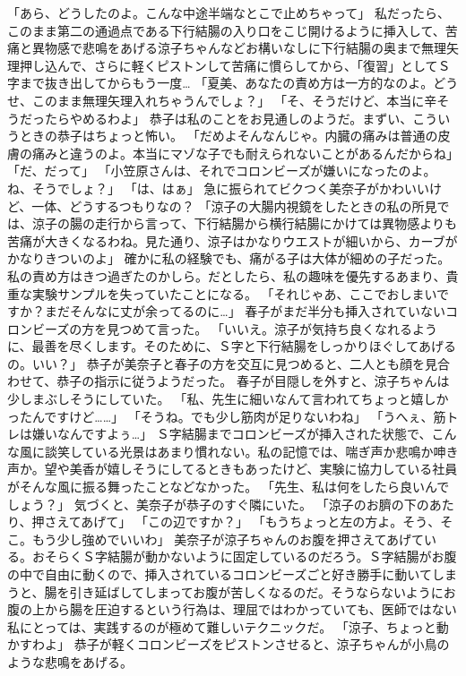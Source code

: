 「あら、どうしたのよ。こんな中途半端なとこで止めちゃって」
私だったら、このまま第二の通過点である下行結腸の入り口をこじ開けるように挿入して、苦痛と異物感で悲鳴をあげる涼子ちゃんなどお構いなしに下行結腸の奥まで無理矢理押し込んで、さらに軽くピストンして苦痛に慣らしてから、「復習」としてＳ字まで抜き出してからもう一度…
「夏美、あなたの責め方は一方的なのよ。どうせ、このまま無理矢理入れちゃうんでしょ？」
「そ、そうだけど、本当に辛そうだったらやめるわよ」
恭子は私のことをお見通しのようだ。まずい、こういうときの恭子はちょっと怖い。
「だめよそんなんじゃ。内臓の痛みは普通の皮膚の痛みと違うのよ。本当にマゾな子でも耐えられないことがあるんだからね」
「だ、だって」
「小笠原さんは、それでコロンビーズが嫌いになったのよ。ね、そうでしょ？」
「は、はぁ」
急に振られてビクつく美奈子がかわいいけど、一体、どうするつもりなの？
「涼子の大腸内視鏡をしたときの私の所見では、涼子の腸の走行から言って、下行結腸から横行結腸にかけては異物感よりも苦痛が大きくなるわね。見た通り、涼子はかなりウエストが細いから、カーブがかなりきついのよ」
確かに私の経験でも、痛がる子は大体が細めの子だった。私の責め方はきつ過ぎたのかしら。だとしたら、私の趣味を優先するあまり、貴重な実験サンプルを失っていたことになる。
「それじゃあ、ここでおしまいですか？まだそんなに丈が余ってるのに…」
春子がまだ半分も挿入されていないコロンビーズの方を見つめて言った。
「いいえ。涼子が気持ち良くなれるように、最善を尽くします。そのために、Ｓ字と下行結腸をしっかりほぐしてあげるの。いい？」
恭子が美奈子と春子の方を交互に見つめると、二人とも顔を見合わせて、恭子の指示に従うようだった。
春子が目隠しを外すと、涼子ちゃんは少しまぶしそうにしていた。
「私、先生に細いなんて言われてちょっと嬉しかったんですけど……」
「そうね。でも少し筋肉が足りないわね」
「うへぇ、筋トレは嫌いなんですよぅ…」
Ｓ字結腸までコロンビーズが挿入された状態で、こんな風に談笑している光景はあまり慣れない。私の記憶では、喘ぎ声か悲鳴か呻き声か。望や美香が嬉しそうにしてるときもあったけど、実験に協力している社員がそんな風に振る舞ったことなどなかった。
「先生、私は何をしたら良いんでしょう？」
気づくと、美奈子が恭子のすぐ隣にいた。
「涼子のお臍の下のあたり、押さえてあげて」
「この辺ですか？」
「もうちょっと左の方よ。そう、そこ。もう少し強めでいいわ」
美奈子が涼子ちゃんのお腹を押さえてあげている。おそらくＳ字結腸が動かないように固定しているのだろう。Ｓ字結腸がお腹の中で自由に動くので、挿入されているコロンビーズごと好き勝手に動いてしまうと、腸を引き延ばしてしまってお腹が苦しくなるのだ。そうならないようにお腹の上から腸を圧迫するという行為は、理屈ではわかっていても、医師ではない私にとっては、実践するのが極めて難しいテクニックだ。
「涼子、ちょっと動かすわよ」
恭子が軽くコロンビーズをピストンさせると、涼子ちゃんが小鳥のような悲鳴をあげる。
